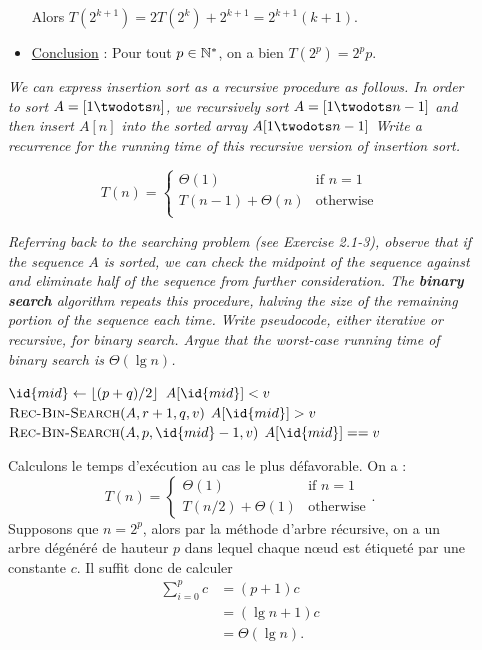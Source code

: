 \begin{description}
\begin{ex}
\begin{itemize}
          Alors $T(2^{k+1}) = 2T(2^k)+2^{k+1} = 2^{k+1}(k+1)$.
        \item \ul{Conclusion} : Pour tout $p \in \mathbb{N}^*$, on a bien $T(2^p) = 2^p p$.
      \end{itemize}
    \end{ex}

   {\itshape We can express insertion sort as a recursive procedure as follows. In order to sort ${ A = [1 \twodots n]}$, we recursively sort $A = [1 \twodots n-1]$ and then insert $A[n]$ into the sorted array ${A[1 \twodots n-1]}$ Write a recurrence for the running time of this recursive version of
insertion sort.}

\begin{ex}
  $$T(n) = \left\{
    \begin{array}{ll}
    \Theta(1) & \text {if } n = 1\\
      T(n-1) + \Theta(n) & \text{otherwise}\\ 
    \end{array}
  \right.$$
\end{ex}

 {\itshape Referring back to the searching problem (see Exercise 2.1-3), observe that if the sequence $A$ is sorted, we can check the midpoint of the sequence against and eliminate half of the sequence from further consideration. The {\bfseries binary search} algorithm repeats this procedure, halving the size of the remaining portion of the sequence each time. Write pseudocode, either iterative or recursive, for binary
  search. Argue that the worst-case running time of binary search is $\Theta (\lg n)$.}
  \begin{ex}
    \begin{codebox}
      \li $\id{mid} \gets \lfloor(p+q)/2\rfloor$
      \li \If $A[\id{mid}] < v$ \Then
      \li $\textsc{Rec-Bin-Search}(A, r+1, q, v)$ \End
      \li \Else \If $A[\id{mid}] > v$ \Then
      \li  $\textsc{Rec-Bin-Search}(A, p, \id{mid}-1, v)$ \End
      \li \Else \If $A[\id{mid}]  == v$ \Then
      \li \Return {}
      \li \Else 
      \li \Return {} \End
    \end{codebox}

    Calculons le temps d'ex\'ecution au cas le plus d\'efavorable. On a :
    $$T(n) = \left\{ 
      \begin{array}{ll}
        \Theta(1) & \text{if } n = 1\\
        T(n/2) + \Theta(1) & \text{otherwise}
      \end{array}
    \right..$$
    Supposons que $n = 2^p$, alors par la m\'ethode d'arbre r\'ecursive, on a un arbre d\'eg\'en\'er\'e de hauteur $p$ dans lequel chaque n\oe ud est \'etiquet\'e par une constante $c$. Il suffit donc de calculer 
    \begin{align*}
      \sum_{i=0}^{p}c &= (p+1)c\\
     &= (\lg n + 1)c\\
     &= \Theta(\lg n).
    \end{align*}
  \end{ex}


\end{description}

